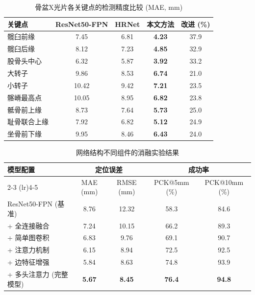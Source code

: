 \begin{table}[htbp]
    \centering
    \caption{骨盆X光片各关键点的检测精度比较 (MAE, mm)}
    \label{tab:keypoint_accuracy}
    \begin{tabular}{lccc>{\columncolor[gray]{0.9}}c}
        \toprule
        关键点 & ResNet50-FPN & HRNet & \textbf{本文方法} & 改进 (\%) \\
        \midrule
        髋臼前缘 & 7.45 & 6.81 & \textbf{4.23} & 37.9 \\
        髋臼后缘 & 8.12 & 7.23 & \textbf{4.85} & 32.9 \\
        股骨头中心 & 6.32 & 5.87 & \textbf{3.92} & 33.2 \\
        大转子 & 9.86 & 8.53 & \textbf{6.74} & 21.0 \\
        小转子 & 10.42 & 9.42 & \textbf{7.21} & 23.5 \\
        髂嵴最高点 & 10.05 & 8.95 & \textbf{6.82} & 23.8 \\
        骶骨前上缘 & 8.73 & 7.64 & \textbf{5.73} & 25.0 \\
        耻骨联合上缘 & 7.92 & 6.82 & \textbf{5.12} & 24.9 \\
        坐骨前下缘 & 9.95 & 8.46 & \textbf{6.43} & 24.0 \\
        \bottomrule
    \end{tabular}
\end{table}

\begin{table}[htbp]
    \centering
    \caption{网络结构不同组件的消融实验结果}
    \label{tab:ablation_studies}
    \begin{tabular}{lcccc}
        \toprule
        \multirow{2}{*}{模型配置} & \multicolumn{2}{c}{定位误差} & \multicolumn{2}{c}{成功率} \\
        \cmidrule(lr){2-3} \cmidrule(lr){4-5}
        & MAE (mm) & RMSE (mm) & PCK@5mm (\%) & PCK@10mm (\%) \\
        \midrule
        ResNet50-FPN (基准) & 8.76 & 12.32 & 58.3 & 84.6 \\
        + 全连接融合 & 7.24 & 10.15 & 66.2 & 89.3 \\
        + 简单图卷积 & 6.83 & 9.76 & 69.1 & 90.7 \\
        + 注意力机制 & 6.15 & 8.94 & 72.5 & 92.5 \\
        + 边特征增强 & 5.84 & 8.63 & 74.8 & 93.9 \\
        + 多头注意力 (完整模型) & \textbf{5.67} & \textbf{8.45} & \textbf{76.4} & \textbf{94.8} \\
        \bottomrule
    \end{tabular}
\end{table}

